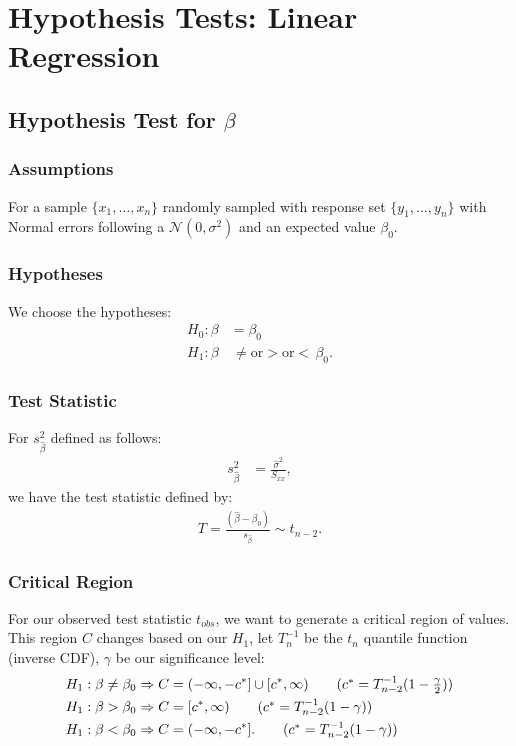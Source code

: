 \documentclass[a4paper, 12pt, twoside]{article}
\begin{document}
\section{Hypothesis Tests: Linear Regression}

\subsection{Hypothesis Test for $\beta$}

\subsubsection{Assumptions}

For a sample $\{x_1, \ldots, x_n\}$ randomly sampled with response
set $\{y_1, \ldots, y_n\}$ with Normal errors following a
$\mathcal{N}(0, \sigma^2)$ and an expected value $\beta_0$.

\subsubsection{Hypotheses}

We choose the hypotheses:
\begin{align*}
    H_0 : \beta & = \beta_0                                   \\
    H_1 : \beta & \, \neq \text{or} > \text{or} < \, \beta_0.
\end{align*}

\subsubsection{Test Statistic}

For $s_{\hat\beta}^2$ defined as follows:
\begin{align}
    s_{\hat\beta}^2  & = \frac{\hat\sigma^2}{S_{xx}},
\end{align}
we have the test statistic defined by:
\begin{align*}
    T = \frac{(\hat\beta - \beta_0)}{s_{\hat\beta}}
    \sim t_{n - 2}.
\end{align*}

\subsubsection{Critical Region}

For our observed test statistic $t_{obs}$, we want to generate a
critical region of values. This region $C$ changes based on our
$H_1$, let $T^{-1}_n$ be the $t_n$ quantile function
(inverse CDF), $\gamma$ be our significance level:
\begin{align*}
    H_1 : \beta \neq \beta_0 & \Rightarrow
    C = (-\infty, -c^*] \cup [c^*, \infty)
    \tag{$ c^* = T_{n-2}^{-1}(1 - \frac{\gamma}{2}) $} \\
    H_1 : \beta > \beta_0    & \Rightarrow
    C = [c^*, \infty)
    \tag{$ c^* = T_{n-2}^{-1}(1 - \gamma) $}           \\
    H_1 : \beta < \beta_0    & \Rightarrow
    C = (-\infty, -c^*].
    \tag{$ c^* = T_{n-2}^{-1}(1 - \gamma) $}
\end{align*}
\end{document}
